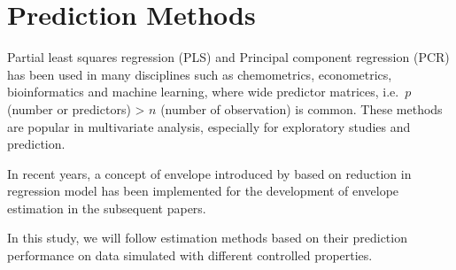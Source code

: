 \documentclass[12pt,3p,authoryear]{elsarticle}
\begin{document}
\hypertarget{prediction-methods}{%
\section{Prediction Methods}\label{prediction-methods}}

Partial least squares regression (PLS) and Principal component
regression (PCR) has been used in many disciplines such as chemometrics,
econometrics, bioinformatics and machine learning, where wide predictor
matrices, i.e.~\(p\) (number or predictors) \textgreater{} \(n\) (number
of observation) is common. These methods are popular in multivariate
analysis, especially for exploratory studies and prediction.

In recent years, a concept of envelope introduced by \citet{Cook2007a}
based on reduction in regression model has been implemented for the
development of envelope estimation in the subsequent papers.

In this study, we will follow estimation methods based on their
prediction performance on data simulated with different controlled
properties.
\end{document}
